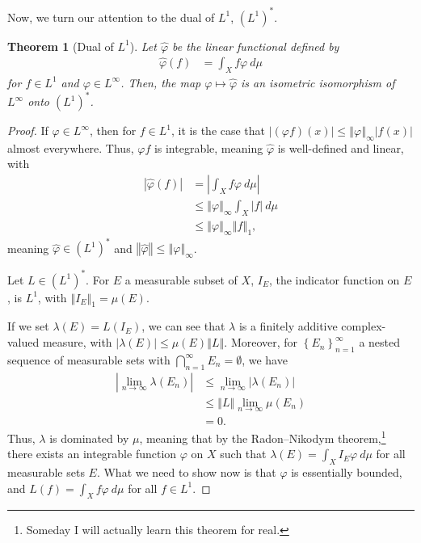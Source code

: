 \documentclass[10pt]{extarticle}
\newcommand{\norm}[1]{\left\Vert #1\right\Vert}
\newcommand{\set}[1]{\left\{#1\right\}}
\theoremstyle{plain}
\newtheorem*{theorem}{Theorem}
\theoremstyle{definition}
\theoremstyle{note}
\renewcommand{\newline}{\hfill\break}
\begin{document}
Now, we turn our attention to the dual of $L^{1}$, $\left(L^{1}\right)^{\ast}$.
\begin{theorem}[Dual of $L^{1}$]
  Let $\hat{\varphi}$ be the linear functional defined by
  \begin{align*}
    \hat{\varphi}(f) &= \int_{X}^{} f\varphi\:d\mu
  \end{align*}
  for $f\in L^{1}$ and $\varphi \in L^{\infty}$. Then, the map $\varphi \mapsto \hat\varphi$ is an isometric isomorphism of $L^{\infty}$ onto $\left(L^{1}\right)^{\ast}$.
\end{theorem}
\begin{proof}
  If $\varphi \in L^{\infty}$, then for $f\in L^{1}$, it is the case that $\left\vert (\varphi f)(x) \right\vert \leq \norm{\varphi}_{\infty}\left\vert f(x) \right\vert$ almost everywhere. Thus, $\varphi f$ is integrable, meaning $\hat{\varphi}$ is well-defined and linear, with
  \begin{align*}
    \left\vert \hat{\varphi}(f) \right\vert &= \left\vert \int_{X}^{} f\varphi\:d\mu \right\vert\\
                                            &\leq \norm{\varphi}_{\infty}\int_{X}^{} |f|\:d\mu\\
                                            &\leq \norm{\varphi}_{\infty}\norm{f}_{1},
  \end{align*}
  meaning $\hat{\varphi}\in \left(L^{1}\right)^{\ast}$ and $\norm{\hat{\varphi}}\leq \norm{\varphi}_{\infty}$.\newline

  Let $L\in \left(L^{1}\right)^{\ast}$. For $E$ a measurable subset of $X$, $I_{E}$, the indicator function on $E$, is $L^{1}$, with $\norm{I_{E}}_{1} = \mu(E)$.\newline

  If we set $\lambda(E) = L(I_E)$, we can see that $\lambda$ is a finitely additive complex-valued measure, with $\left\vert \lambda(E) \right\vert\leq \mu(E) \norm{L}$. Moreover, for $\set{E_n}_{n=1}^{\infty}$ a nested sequence of measurable sets with $\bigcap_{n=1}^{\infty} E_n = \emptyset$, we have
  \begin{align*}
    \left\vert \lim_{n\rightarrow\infty}\lambda\left(E_n\right) \right\vert &\leq \lim_{n\rightarrow\infty}\left\vert \lambda\left(E_n\right) \right\vert\\
                                                                            &\leq \norm{L}\lim_{n\rightarrow\infty}\mu\left(E_n\right)\\
                                                                            &= 0.
  \end{align*}
  Thus, $\lambda$ is dominated by $\mu$, meaning that by the Radon--Nikodym theorem,\footnote{Someday I will actually learn this theorem for real.} there exists an integrable function $\varphi$ on $X$ such that $\lambda(E) = \int_{X}I_E\varphi \: d\mu$ for all measurable sets $E$. What we need to show now is that $\varphi$ is essentially bounded, and $L(f) = \int_{X}f\varphi\:d\mu$ for all $f\in L^1$.\newline


\end{proof}
\end{document}

